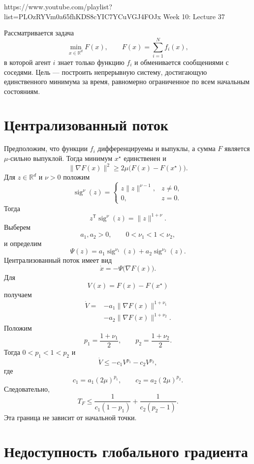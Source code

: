 
\sourcevideo
    {https://www.youtube.com/playlist?list=PLOzRYVm0a65fhKDS8cYIC7YCuVGJ4FOJx}
    {Week 10: Lecture 37}

Рассматривается задача
\[
    \min_{x\in\mathbb R^d}F(x),
    \qquad
    F(x)=\sum_{i=1}^{N}f_i(x),
\]
в которой агент \(i\) знает только функцию \(f_i\) и обменивается
сообщениями с соседями. Цель --- построить непрерывную систему,
достигающую единственного минимума за время, равномерно ограниченное
по всем начальным состояниям.

\section{Централизованный поток}

Предположим, что функции \(f_i\) дифференцируемы и выпуклы, а сумма
\(F\) является \(\mu\)-сильно выпуклой. Тогда минимум \(x^\star\)
единственен и
\[
    \lVert\nabla F(x)\rVert^2
    \ge
    2\mu\bigl(F(x)-F(x^\star)\bigr).
\]
Для \(z\in\mathbb R^d\) и \(\nu>0\) положим
\[
    \operatorname{sig}^{\nu}(z)
    =
    \begin{cases}
        z\lVert z\rVert^{\nu-1},&z\ne0,\\[1mm]
        0,&z=0.
    \end{cases}
\]
Тогда
\[
    z^{\mathsf T}\operatorname{sig}^{\nu}(z)
    =
    \lVert z\rVert^{1+\nu}.
\]
Выберем
\[
    a_1,a_2>0,
    \qquad
    0<\nu_1<1<\nu_2,
\]
и определим
\[
    \Psi(z)
    =
    a_1\operatorname{sig}^{\nu_1}(z)
    +
    a_2\operatorname{sig}^{\nu_2}(z).
\]
Централизованный поток имеет вид
\[
    \dot x=-\Psi\bigl(\nabla F(x)\bigr).
\]
Для
\[
    V(x)=F(x)-F(x^\star)
\]
получаем
\[
\begin{aligned}
    \dot V
    ={}&
    -a_1\lVert\nabla F(x)\rVert^{1+\nu_1}
    \\
    &-
    a_2\lVert\nabla F(x)\rVert^{1+\nu_2}.
\end{aligned}
\]
Положим
\[
    p_1=\frac{1+\nu_1}{2},
    \qquad
    p_2=\frac{1+\nu_2}{2}.
\]
Тогда \(0<p_1<1<p_2\) и
\[
    \dot V
    \le
    -c_1V^{p_1}-c_2V^{p_2},
\]
где
\[
    c_1=a_1(2\mu)^{p_1},
    \qquad
    c_2=a_2(2\mu)^{p_2}.
\]
Следовательно,
\[
    T_F
    \le
    \frac1{c_1(1-p_1)}
    +
    \frac1{c_2(p_2-1)}.
\]
Эта граница не зависит от начальной точки.

\section{Недоступность глобального градиента}

